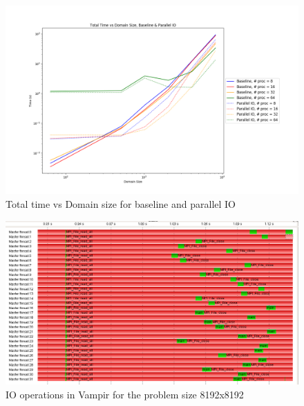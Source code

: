 \begin{enumerate}
 \begin{figure}[p] %
  \begin{center}
    \includegraphics[width=.9\linewidth]{Figures/io/total_multproc_haswell_io_baseline.png} %
    \caption{Total time vs Domain size for baseline and parallel IO}
    \label{fig:par_io_total_vs_domain}
  \end{center}
  \end{figure}
 
 \begin{figure}[p] %
   \begin{center}
     \includegraphics[width=.9\linewidth]{Figures/io/io_vampir_biggest_size.png} %
     \caption{IO operations in Vampir for the problem size 8192x8192}
     \label{fig:par_io_vampir}
   \end{center}
 \end{figure} 
 
\end{enumerate}

